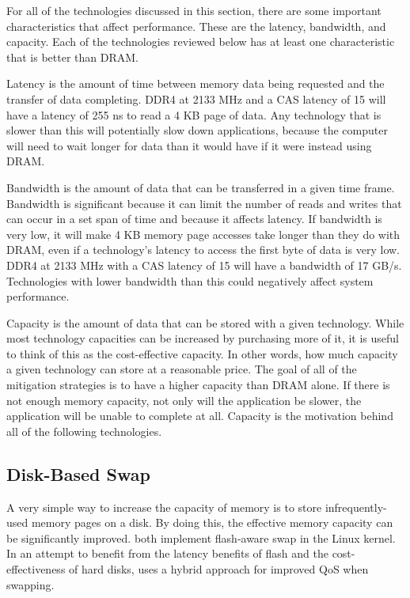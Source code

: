 \documentclass[doublespace,nopageskip]{VTthesis}
\begin{document}
For all of the technologies discussed in this section, there are some important characteristics that affect performance. These are the latency, bandwidth, and capacity. Each of the technologies reviewed below has at least one characteristic that is better than DRAM.

Latency is the amount of time between memory data being requested and the transfer of data completing. DDR4 at 2133 MHz and a CAS latency of 15 will have a latency of 255 ns to read a 4 KB page of data. Any technology that is slower than this will potentially slow down applications, because the computer will need to wait longer for data than it would have if it were instead using DRAM.

Bandwidth is the amount of data that can be transferred in a given time frame. Bandwidth is significant because it can limit the number of reads and writes that can occur in a set span of time and because it affects latency. If bandwidth is very low, it will make 4 KB memory page accesses take longer than they do with DRAM, even if a technology's latency to access the first byte of data is very low. DDR4 at 2133 MHz with a CAS latency of 15 will have a bandwidth of 17 GB/s. Technologies with lower bandwidth than this could negatively affect system performance.

Capacity is the amount of data that can be stored with a given technology. While most technology capacities can be increased by purchasing more of it, it is useful to think of this as the cost-effective capacity. In other words, how much capacity a given technology can store at a reasonable price. The goal of all of the mitigation strategies is to have a higher capacity than DRAM alone. If there is not enough memory capacity, not only will the application be slower, the application will be unable to complete at all. Capacity is the motivation behind all of the following technologies.

\subsection{Disk-Based Swap}\label{ss:disk-based_swap}
A very simple way to increase the capacity of memory is to store infrequently-used memory pages on a disk. By doing this, the effective memory capacity can be significantly improved.\cite{fass,flashawareswap} both implement flash-aware swap in the Linux kernel. In an attempt to benefit from the latency benefits of flash and the cost-effectiveness of hard disks, \cite{hybridswap} uses a hybrid approach for improved QoS when swapping.
\end{document}
